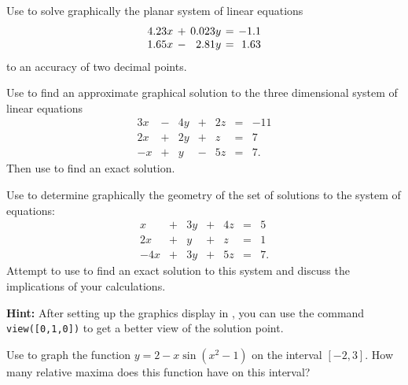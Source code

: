 \documentclass{ximera}
\begin{document}
\begin{exercise} \label{c2.2.2}
Use \Matlab to solve graphically the planar system of linear
equations
\[
\arraycolsep 2pt
\begin{array}{rcrcr}
4.23x & + & 0.023y & = & -1.1 \\
1.65x & - & 2.81y & = &  1.63
\end{array}
\]
to an accuracy of two decimal points.
\end{exercise}


\begin{exercise} \label{c2.2.3}
Use \Matlab to find an approximate graphical solution to the
three dimensional system of linear equations
\[
\begin{array}{rcrcrcr}
 3x & - & 4y & + & 2z  & = & -11\\
 2x & + & 2y & + &  z  & = &   7\\
 -x & + &  y & - & 5z  & = &   7.
\end{array}
\]
Then use \Matlab to find an exact solution.
\end{exercise}


\begin{exercise} \label{c2.2.4}
Use \Matlab to determine graphically the geometry of the set of
solutions to the system of equations:
\[
\begin{array}{rcrcrcr}
  x & + & 3y & + & 4z  & = & 5\\
 2x & + &  y & + &  z  & = & 1\\
-4x & + & 3y & + & 5z  & = & 7.
\end{array}
\]
Attempt to use \Matlab to find an exact solution to this system
and discuss the implications of your calculations.

{\bf Hint:} After setting up the graphics display in \Matlabp,
you can use the command {\tt view([0,1,0])}  to get
a better view of the solution point.
\end{exercise}

\begin{exercise} \label{c2.2.a5}
Use \Matlab to graph the function $y = 2 - x\sin(x^2-1)$ on the interval
$[-2,3]$.  How many relative maxima does this function have on this interval?
\end{exercise}
\end{document}

